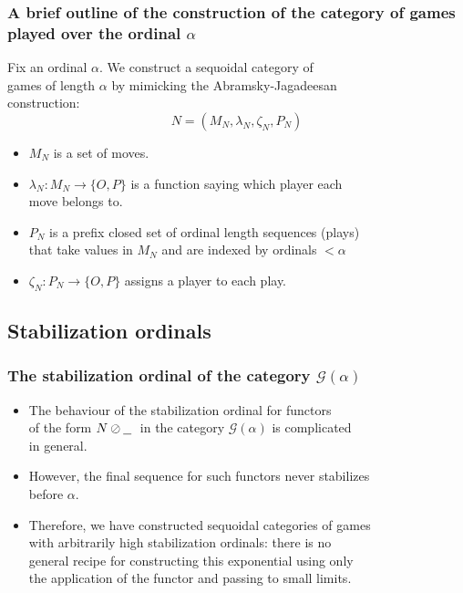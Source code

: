 \documentclass{beamer}
\newcommand*\from{\colon}
\newcommand{\cmap}[3]{#1\from{}#2\to{}#3}
\newcommand{\sequoid}{\oslash}
\newcommand{\G}{\mathcal G}
\newcommand{\OP}{\{O,P\}}
\newcommand{\nsb}{N\sequoid\underline{\hspace{1.5ex}}\;}
\begin{document}
\begin{frame}
  \frametitle{A brief outline of the construction of the category of games played over the ordinal $\alpha$}

  Fix an ordinal $\alpha$.  We construct a sequoidal category of \\
  games of length $\alpha$ by mimicking the Abramsky-Jagadeesan \\
  construction:
  \[
    N=(M_N, \lambda_N, \zeta_N, P_N)
    \]

  \begin{itemize}
    \item $M_N$ is a set of moves.
    \item $\cmap{\lambda_N}{M_N}{\OP}$ is a function saying which player each \\
      move belongs to.
    \item $P_N$ is a prefix closed set of ordinal length sequences (plays) \\
      that take values in $M_N$ and are indexed by ordinals $<\alpha$
    \item $\cmap{\zeta_N}{P_N}{\OP}$ assigns a player to each play.
  \end{itemize}

\end{frame}

\subsection{Stabilization ordinals}

\begin{frame}
  \frametitle{The stabilization ordinal of the category $\G(\alpha)$}

  \begin{itemize}
    \item The behaviour of the stabilization ordinal for functors \\
      of the form $\nsb$ in the category $\G(\alpha)$ is complicated \\
      in general.
    \item However, the final sequence for such functors never stabilizes \\
      before $\alpha$.
    \item Therefore, we have constructed sequoidal categories of games \\
      with arbitrarily high stabilization ordinals: there is no \\
      general recipe for constructing this exponential using only \\
      the application of the functor and passing to small limits.
  \end{itemize}
\end{frame}
\end{document}
